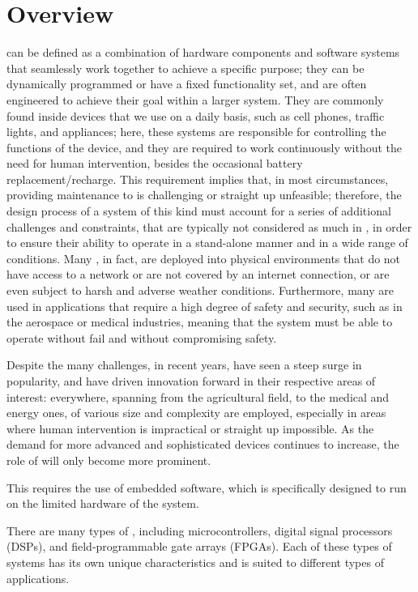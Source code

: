 \section{Overview}
\ess can be defined as a combination of hardware components and software systems that seamlessly work together to achieve a specific purpose; they can be dynamically programmed or have a fixed functionality set, and are often engineered to achieve their goal within a larger system. They are commonly found inside devices that we use on a daily basis, such as cell phones, traffic lights, and appliances; here, these systems are responsible for controlling the functions of the device, and they are required to work continuously without the need for human intervention, besides the occasional battery replacement/recharge.
This requirement implies that, in most circumstances, providing maintenance to \ess is challenging or straight up unfeasible; therefore, the design process of a system of this kind must account for a series of additional challenges and constraints, that are typically not considered as much in \noess, in order to ensure their ability to operate in a stand-alone manner and in a wide range of conditions. Many \ess, in fact, are deployed into physical environments that do not have access to a network or are not covered by an internet connection, or are even subject to harsh and adverse weather conditions.
Furthermore, many \ess are used in applications that require a high degree of safety and security, such as in the aerospace or medical industries, meaning that the system must be able to operate without fail and without compromising safety. 

Despite the many challenges, in recent years, \ess have seen a steep surge in popularity, and have driven innovation forward in their respective areas of interest: everywhere, spanning from the agricultural field, to the medical and energy ones, \ess of various size and complexity are employed, especially in areas where human intervention is impractical or straight up impossible.
As the demand for more advanced and sophisticated devices continues to increase, the role of \ess will only become more prominent.



This requires the use of embedded software, which is specifically designed to run on the limited hardware of the system.

There are many types of \ess, including microcontrollers, digital signal processors (DSPs), and field-programmable gate arrays (FPGAs). Each of these types of systems has its own unique characteristics and is suited to different types of applications.


